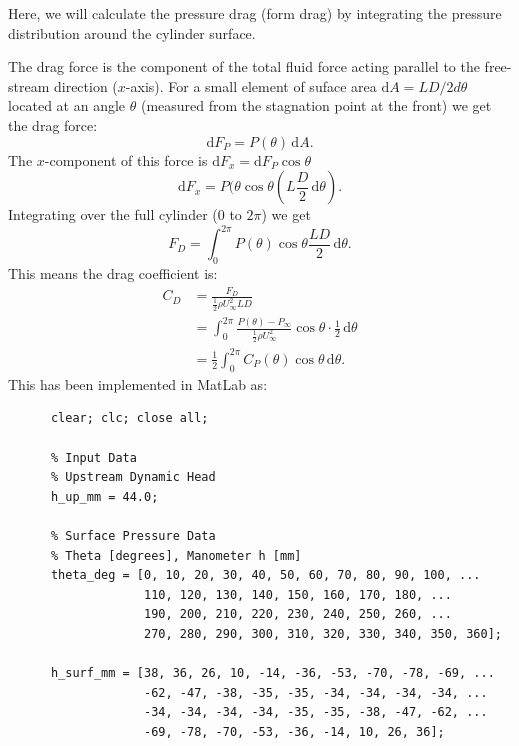   \begin{derivation}
    Here, we will calculate the pressure drag (form drag) by integrating the pressure distribution around the cylinder surface.

    The drag force is the component of the total fluid force acting parallel to the free-stream direction ($x$-axis).
    For a small element of suface area $\mathrm{d}A = L D / 2 d\theta$ located at an angle $\theta$ (measured from the stagnation point at the front) we get the drag force:
    \begin{equation*}
      \mathrm{d}F_P = P (\theta) \, \mathrm{d}A
    .\end{equation*}
    The $x$-component of this force is $\mathrm{d}F_x = \mathrm{d}F_P \cos \theta$
    \begin{equation*}
      \mathrm{d}F_x = P(\theta \cos \theta \left( L \frac{D}{2} \, \mathrm{d}\theta \right)
    .\end{equation*}
    Integrating over the full cylinder ($0$ to $2 \pi$) we get
    \begin{equation*}
      F_D = \int_{0}^{2\pi} P(\theta) \cos \theta \frac{LD}{2} \, \mathrm{d}\theta
    .\end{equation*}
    This means the drag coefficient is:
    \begin{align*}
      C_D &= \frac{F_D}{\frac{1}{2} \rho U^2_{\infty} LD} \\
      &= \int_{0}^{2\pi} \frac{P(\theta) - P_{\infty}}{\frac{1}{2}\rho U^2_{\infty}} \cos \theta \cdot \frac{1}{2} \, \mathrm{d}\theta \\
      &= \frac{1}{2} \int_{0}^{2\pi} C_P \left( \theta \right) \cos \theta \, \mathrm{d}\theta
    .\end{align*}
    This has been implemented in MatLab as:
    \begin{verbatim}
      clear; clc; close all;

      % Input Data
      % Upstream Dynamic Head
      h_up_mm = 44.0; 

      % Surface Pressure Data
      % Theta [degrees], Manometer h [mm]
      theta_deg = [0, 10, 20, 30, 40, 50, 60, 70, 80, 90, 100, ...
                   110, 120, 130, 140, 150, 160, 170, 180, ...
                   190, 200, 210, 220, 230, 240, 250, 260, ...
                   270, 280, 290, 300, 310, 320, 330, 340, 350, 360];

      h_surf_mm = [38, 36, 26, 10, -14, -36, -53, -70, -78, -69, ...
                   -62, -47, -38, -35, -35, -34, -34, -34, -34, ...
                   -34, -34, -34, -34, -35, -35, -38, -47, -62, ...
                   -69, -78, -70, -53, -36, -14, 10, 26, 36];


\end{verbatim}
\end{derivation}
